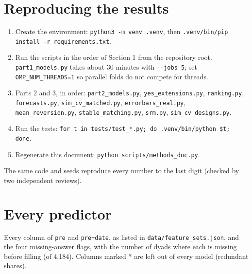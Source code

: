 \documentclass[11pt]{article}
\begin{document}
\normalsize

\section{Reproducing the results}

\begin{enumerate}
\item Create the environment: \texttt{python3 -m venv .venv}, then \texttt{.venv/bin/pip install -r requirements.txt}.
\item Run the scripts in the order of Section 1 from the repository root. \texttt{part1\_models.py} takes about 30
minutes with \texttt{-{}-jobs 5}; set \texttt{OMP\_NUM\_THREADS=1} so parallel folds do not compete for threads.
\item Parts 2 and 3, in order: \texttt{part2\_models.py}, \texttt{yes\_extensions.py}, \texttt{ranking.py},
\texttt{forecasts.py}, \texttt{sim\_cv\_matched.py}, \texttt{errorbars\_real.py}, \texttt{mean\_reversion.py},
\texttt{stable\_matching.py}, \texttt{srm.py}, \texttt{sim\_cv\_designs.py}.
\item Run the tests: \texttt{for t in tests/test\_*.py; do .venv/bin/python \$t; done}.
\item Regenerate this document: \texttt{python scripts/methods\_doc.py}.
\end{enumerate}
The same code and seeds reproduce every number to the last digit (checked by two independent reviews).

\appendix

\section{Every predictor}

Every column of \texttt{pre} and \texttt{pre+date}, as listed in \texttt{data/feature\_sets.json}, and the four missing-answer flags, with the number of dyads where each is missing before filling (of 4,184). Columns marked * are left out of every model (redundant shares).
\end{document}
